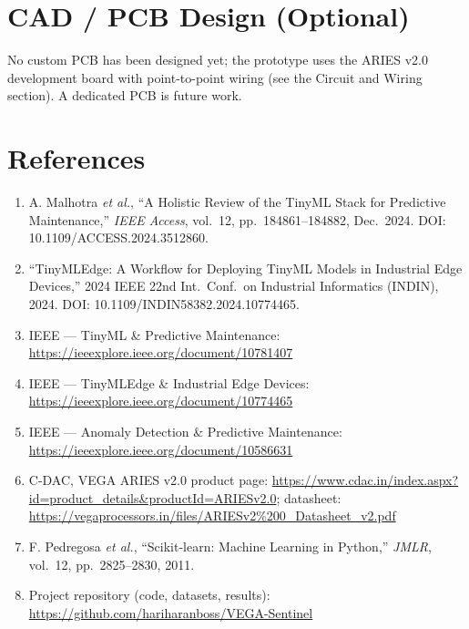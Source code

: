 \documentclass[11pt]{article}
\begin{document}
\section{CAD / PCB Design (Optional)}
No custom PCB has been designed yet; the prototype uses the ARIES
v2.0 development board with point-to-point wiring (see the Circuit
and Wiring section). A dedicated PCB is future work.

\section{References}
\begin{enumerate}[nosep]
  \item A. Malhotra \emph{et al.}, ``A Holistic Review of the TinyML
    Stack for Predictive Maintenance,'' \emph{IEEE Access}, vol.~12,
    pp.~184861--184882, Dec.~2024. DOI: 10.1109/ACCESS.2024.3512860.
  \item ``TinyMLEdge: A Workflow for Deploying TinyML Models in
    Industrial Edge Devices,'' 2024 IEEE 22nd Int.\ Conf.\ on
    Industrial Informatics (INDIN), 2024.
    DOI: 10.1109/INDIN58382.2024.10774465.
  \item IEEE --- TinyML \& Predictive Maintenance:
    \url{https://ieeexplore.ieee.org/document/10781407}
  \item IEEE --- TinyMLEdge \& Industrial Edge Devices:
    \url{https://ieeexplore.ieee.org/document/10774465}
  \item IEEE --- Anomaly Detection \& Predictive Maintenance:
    \url{https://ieeexplore.ieee.org/document/10586631}
  \item C-DAC, VEGA ARIES v2.0 product page:
    \url{https://www.cdac.in/index.aspx?id=product_details&productId=ARIESv2.0};
    datasheet:
    \url{https://vegaprocessors.in/files/ARIESv2%200_Datasheet_v2.pdf}
  \item F. Pedregosa \emph{et al.}, ``Scikit-learn: Machine Learning
    in Python,'' \emph{JMLR}, vol.~12, pp.~2825--2830, 2011.
  \item Project repository (code, datasets, results):
    \url{https://github.com/hariharanboss/VEGA-Sentinel}
\end{enumerate}
\end{document}
